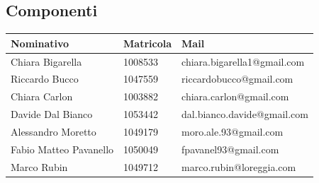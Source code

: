\subsection{Componenti}
	\begin{center}
	\begin{tabu} to \textwidth {|X[4]|X[2c]|X[5]|}
	\hline
     Nominativo & Matricola & Mail \\ \hline
     Chiara Bigarella & 1008533 & chiara.bigarella1@gmail.com \\ \hline
     Riccardo Bucco & 1047559 & riccardobucco@gmail.com \\ \hline
     Chiara Carlon & 1003882 & chiara.carlon@gmail.com \\ \hline
     Davide Dal Bianco & 1053442 & dal.bianco.davide@gmail.com \\ \hline
     Alessandro Moretto & 1049179 & moro.ale.93@gmail.com \\ \hline
     Fabio Matteo Pavanello & 1050049 & fpavanel93@gmail.com \\ \hline
     Marco Rubin & 1049712 & marco.rubin@loreggia.com \\ \hline
     \end{tabu}
	\end{center}
